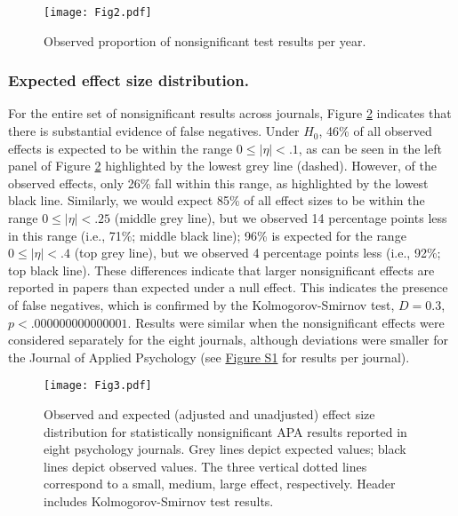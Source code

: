\documentclass{article}
\begin{document}
\begin{figure}
\begin{center}
\texttt{[image: Fig2.pdf]}
\end{center}
\caption{Observed proportion of nonsignificant test results per year.}
\label{fig:fig2}
\end{figure}

\subsubsection*{Expected effect size distribution.}


For the entire set of nonsignificant results across journals, Figure \ref{fig:fig3} indicates that there is substantial evidence of false negatives. Under $H_0$, 46\% of all observed effects is expected to be within the range $0\leq|\eta|<.1$, as can be seen in the left panel of Figure \ref{fig:fig3} highlighted by the lowest grey line (dashed). However, of the observed effects, only 26\% fall within this range, as highlighted by the lowest black line. Similarly, we would expect 85\% of all effect sizes to be within the range $0\leq|\eta|<.25$ (middle grey line), but we observed 14 percentage points less in this range (i.e., 71\%; middle black line); 96\% is expected for the range $0\leq|\eta|<.4$ (top grey line), but we observed 4 percentage points less (i.e., 92\%; top black line). These differences indicate that larger nonsignificant effects are reported in papers than expected under a null effect. This indicates the presence of false negatives, which is confirmed by the Kolmogorov-Smirnov test, $D=0.3$, $p<.000000000000001$. Results were similar when the nonsignificant effects were considered separately for the eight journals, although deviations were smaller for the Journal of Applied Psychology (see \href{S1Fig}{Figure S1} for results per journal).

\begin{figure}
\begin{center}
\texttt{[image: Fig3.pdf]}
\end{center}
\caption{Observed and expected (adjusted and unadjusted) effect size distribution for statistically nonsignificant APA results reported in eight psychology journals. Grey lines depict expected values; black lines depict observed values. The three vertical dotted lines correspond to a small, medium, large effect, respectively. Header includes Kolmogorov-Smirnov test results.}
\label{fig:fig3}
\end{figure}
\end{document}
